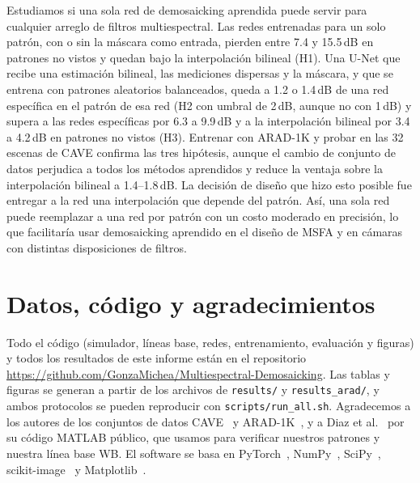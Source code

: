 \documentclass{article}
\begin{document}
Estudiamos si una sola red de demosaicking aprendida puede servir para
cualquier arreglo de filtros multiespectral. Las redes entrenadas para un
solo patrón, con o sin la máscara como entrada, pierden entre 7.4 y
15.5\,dB en patrones no vistos y quedan bajo la interpolación bilineal (H1).
Una U-Net que recibe una estimación bilineal, las mediciones dispersas y la
máscara, y que se entrena con patrones aleatorios balanceados, queda a 1.2
o 1.4\,dB de una red específica en el patrón de esa red (H2 con umbral de
2\,dB, aunque no con 1\,dB) y supera a las redes específicas por 6.3 a
9.9\,dB y a la interpolación bilineal por 3.4 a 4.2\,dB en patrones no
vistos (H3). Entrenar con ARAD-1K y probar en las 32 escenas de CAVE
confirma las tres hipótesis, aunque el cambio de conjunto de datos perjudica
a todos los métodos aprendidos y reduce la ventaja sobre la interpolación
bilineal a 1.4--1.8\,dB. La decisión de diseño que hizo esto posible fue
entregar a la red una interpolación que depende del patrón. Así, una sola
red puede reemplazar a una red por patrón con un costo moderado en
precisión, lo que facilitaría usar demosaicking aprendido en el diseño de
MSFA y en cámaras con distintas disposiciones de filtros.

\section{Datos, código y agradecimientos}
\label{sec:ack}

Todo el código (simulador, líneas base, redes, entrenamiento, evaluación y
figuras) y todos los resultados de este informe están en el repositorio
{\small\url{https://github.com/GonzaMichea/Multiespectral-Demosaicking}}.
Las tablas y figuras se generan a partir de los archivos de
\texttt{results/} y \texttt{results\_arad/}, y ambos protocolos se pueden
reproducir con \texttt{scripts/run\_all.sh}. Agradecemos a los autores de
los conjuntos de datos CAVE~\cite{yasuma2010} y ARAD-1K~\cite{arad2022}, y a
Diaz et al.~\cite{diaz2023} por su código MATLAB público, que usamos para
verificar nuestros patrones y nuestra línea base WB. El software se basa en
PyTorch~\cite{paszke2019}, NumPy~\cite{harris2020},
SciPy~\cite{virtanen2020}, scikit-image~\cite{vanderwalt2014} y
Matplotlib~\cite{hunter2007}.

\begingroup
\small


\endgroup
\end{document}
